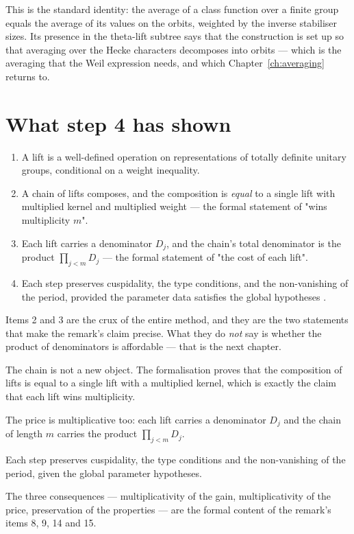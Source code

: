 This is the standard identity: the average of a class function over a finite
group equals the average of its values on the orbits, weighted by the inverse
stabiliser sizes. Its presence in the theta-lift subtree says that the
construction is set up so that averaging over the Hecke characters decomposes
into orbits --- which is the averaging that the Weil expression needs, and
which Chapter~\ref{ch:averaging} returns to.

\section{What step 4 has shown}\begin{enumerate}
\item A lift is a well-defined operation on representations of totally
definite unitary groups, conditional on a weight inequality.
\item A chain of lifts composes, and the composition is \emph{equal} to a
single lift with multiplied kernel and multiplied weight --- the formal
statement of "wins multiplicity $m$".
\item Each lift carries a denominator $D_j$, and the chain's total denominator
is the product $\prod_{j<m} D_j$ --- the formal statement of "the cost of
each lift".
\item Each step preserves cuspidality, the type conditions, and the
non-vanishing of the period, provided the parameter data satisfies the global
hypotheses .
\end{enumerate}

Items 2 and 3 are the crux of the entire method, and they are the two
statements that make the remark's claim precise. What they do \emph{not} say is
whether the product of denominators is affordable --- that is the next chapter.

\begin{keytakeaways}
\item The chain is not a new object. The formalisation proves that the
composition of lifts is equal to a single lift with a multiplied kernel, which
is exactly the claim that each lift wins multiplicity.
\item The price is multiplicative too: each lift carries a denominator $D_j$ and
the chain of length $m$ carries the product $\prod_{j<m} D_j$.
\item Each step preserves cuspidality, the type conditions and the
non-vanishing of the period, given the global parameter hypotheses.
\item The three consequences --- multiplicativity of the gain, multiplicativity
of the price, preservation of the properties --- are the formal content of
the remark's items 8, 9, 14 and 15.
\end{keytakeaways}
